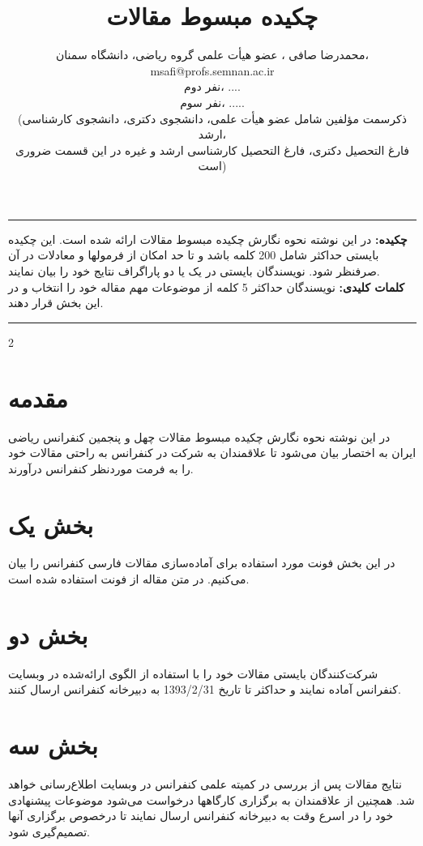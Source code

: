 \documentclass[a4paper,10pt]{article}
\title{\textbf{ چکیده مبسوط مقالات }}
\date{}
\author{\small محمدرضا صافی ، عضو هيأت علمی گروه ‌ریاضی، دانشگاه سمنان، msafi@profs.semnan.ac.ir\\
\small نفر دوم، ....\\
\small نفر سوم، .....\\
\small  (ذكرسمت مؤلفين شامل عضو هيأت علمی، دانشجوی دكتری، دانشجوی كارشناسی ارشد، \\
\small فارغ التحصيل دكتری، فارغ التحصيل كارشناسی ارشد و غيره در اين قسمت ضروری است)}
\begin{document}
\maketitle
\thispagestyle{fancy}

\rule{\textwidth}{0.2mm}

\noindent
\textbf{چکیده:}
 در این نوشته نحوه نگارش چکیده مبسوط مقالات ارائه شده است. این چکیده بایستی حداکثر شامل 200 کلمه باشد و تا حد امکان از فرمولها و معادلات در آن صرفنظر شود. نویسندگان بایستی در یک یا دو پاراگراف نتایج خود را بیان نمایند. \\
\textbf{ کلمات کلیدی:}
 نویسندگان حداکثر 5 کلمه از موضوعات مهم مقاله خود را انتخاب و در این بخش قرار دهند. 
\rule{\textwidth}{0.2mm}


\setlength{\columnsep}{1cm}
\begin{multicols}{2}

\section*{مقدمه}

در این نوشته نحوه نگارش چکیده مبسوط مقالات چهل و پنجمین کنفرانس ریاضی ایران به اختصار بیان می‌شود تا علاقمندان به شرکت در کنفرانس به راحتی مقالات خود را به فرمت موردنظر کنفرانس درآورند. 

\section*{بخش یک}

در این بخش فونت مورد استفاده برای آماده‌سازی مقالات فارسی کنفرانس را بیان می‌کنیم. در متن مقاله از فونت
  استفاده شده است. 

\section*{بخش دو}

شرکت‌کنندگان بایستی مقالات خود را با استفاده از الگوی ارائه‌شده در وبسایت کنفرانس آماده نمایند و حداکثر تا تاریخ 1393/2/31 به دبیرخانه کنفرانس ارسال کنند. 

\section*{بخش سه}

نتایج مقالات پس از بررسی در کمیته علمی کنفرانس در وبسایت اطلاع‌رسانی خواهد شد. همچنین از علاقمندان به برگزاری کارگاهها درخواست می‌شود موضوعات پیشنهادی خود را در اسرع وقت به دبیرخانه کنفرانس ارسال نمایند تا درخصوص برگزاری آنها تصمیم‌گیری شود. 


\end{multicols}
\end{document}
